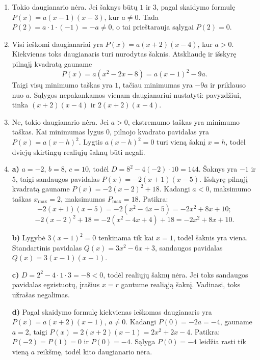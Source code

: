 \documentclass[12pt,a4paper]{article}
\begin{document}
\begin{enumerate}
\textbf{b)} Pagal Vijeto teoremą vienintelė galima redukuotoji lygtis yra $x^2-2x-3=0$. Kadangi $3+(-1)=2$ ir $3\cdot(-1)=-3$, pagal atvirkštinę teoremą jos šaknys yra $3$ ir $-1$; kitų nėra.

\textbf{c)} Todėl $P(x)=a(x-3)(x+1)$. Iš $P(0)=-3a=-9$ randame $a=3$. Taigi
\[P(x)=3(x-3)(x+1)=3x^2-6x-9=3(x-1)^2-12.\]
Patikra: šaknų suma $3+(-1)=2$, kvadratų suma $9+1=10$, o $P(0)=-9$. Kiekvienas sąlygas tenkinantis daugianaris turi tas pačias šaknis ir tą patį $a$, todėl atsakymas vienintelis.
\item Tokio daugianario nėra. Jei šaknys būtų $1$ ir $3$, pagal skaidymo formulę $P(x)=a(x-1)(x-3)$, kur $a\ne0$. Tada $P(2)=a\cdot1\cdot(-1)=-a\ne0$, o tai prieštarauja sąlygai $P(2)=0$.
\item Visi ieškomi daugianariai yra $P(x)=a(x+2)(x-4)$, kur $a>0$. Kiekvienas toks daugianaris turi nurodytas šaknis. Atskliaudę ir išskyrę pilnąjį kvadratą gauname
\[P(x)=a(x^2-2x-8)=a(x-1)^2-9a.\]
Taigi visų minimumo taškas yra $1$, tačiau minimumas yra $-9a$ ir priklauso nuo $a$. Sąlygos nepakankamos vienam daugianariui nustatyti: pavyzdžiui, tinka $(x+2)(x-4)$ ir $2(x+2)(x-4)$.
\item Ne, tokio daugianario nėra. Jei $a>0$, ekstremumo taškas yra minimumo taškas. Kai minimumas lygus $0$, pilnojo kvadrato pavidalas yra $P(x)=a(x-h)^2$. Lygtis $a(x-h)^2=0$ turi vieną šaknį $x=h$, todėl dviejų skirtingų realiųjų šaknų būti negali.
\item \textbf{a)} $a=-2$, $b=8$, $c=10$, todėl $D=8^2-4(-2)\cdot10=144$. Šaknys yra $-1$ ir $5$, taigi sandaugos pavidalas $P(x)=-2(x+1)(x-5)$. Išskyrę pilnąjį kvadratą gauname $P(x)=-2(x-2)^2+18$. Kadangi $a<0$, maksimumo taškas $x_{\max}=2$, maksimumas $P_{\max}=18$. Patikra:
\[-2(x+1)(x-5)=-2(x^2-4x-5)=-2x^2+8x+10;\]
\[-2(x-2)^2+18=-2(x^2-4x+4)+18=-2x^2+8x+10.\]

\textbf{b)} Lygybė $3(x-1)^2=0$ tenkinama tik kai $x=1$, todėl šaknis yra viena. Standartinis pavidalas $Q(x)=3x^2-6x+3$, sandaugos pavidalas $Q(x)=3(x-1)(x-1)$.

\textbf{c)} $D=2^2-4\cdot1\cdot3=-8<0$, todėl realiųjų šaknų nėra. Jei toks sandaugos pavidalas egzistuotų, įrašius $x=r$ gautume realiąją šaknį. Vadinasi, toks užrašas negalimas.

\textbf{d)} Pagal skaidymo formulę kiekvienas ieškomas daugianaris yra $P(x)=a(x+2)(x-1)$, $a\ne0$. Kadangi $P(0)=-2a=-4$, gauname $a=2$, taigi $P(x)=2(x+2)(x-1)=2x^2+2x-4$. Patikra: $P(-2)=P(1)=0$ ir $P(0)=-4$. Sąlyga $P(0)=-4$ leidžia rasti tik vieną $a$ reikšmę, todėl kito daugianario nėra.
\end{enumerate}
\end{document}
